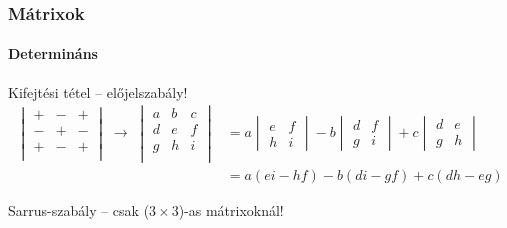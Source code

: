 \documentclass[xcolor={table}]{beamer}
\begin{document}
\begin{frame}
  \frametitle{Mátrixok}
  \framesubtitle{Determináns}

  \vspace{-5mm}
  \begin{block}{Kifejtési tétel -- előjelszabály!}
    \begin{align*}
      \begin{vmatrix}
        + & - & + \\
        - & + & - \\
        + & - & + \\
      \end{vmatrix}
      \; \rightarrow \;
      \begin{vmatrix}
        a & b & c \\
        d & e & f \\
        g & h & i \\
      \end{vmatrix}
       & = a \begin{vmatrix}
               e & f \\ h & i
             \end{vmatrix}
      - b \begin{vmatrix}
            d & f \\ g & i
          \end{vmatrix}
      + c \begin{vmatrix}
            d & e \\ g & h
          \end{vmatrix}
      \\
       & = a (ei - hf) - b(di - gf) + c(dh - eg)
    \end{align*}
  \end{block}

  \begin{block}{Sarrus-szabály -- csak ($3 \times 3$)-as mátrixoknál!}
    \centering
\end{block}
\end{frame}
\end{document}
